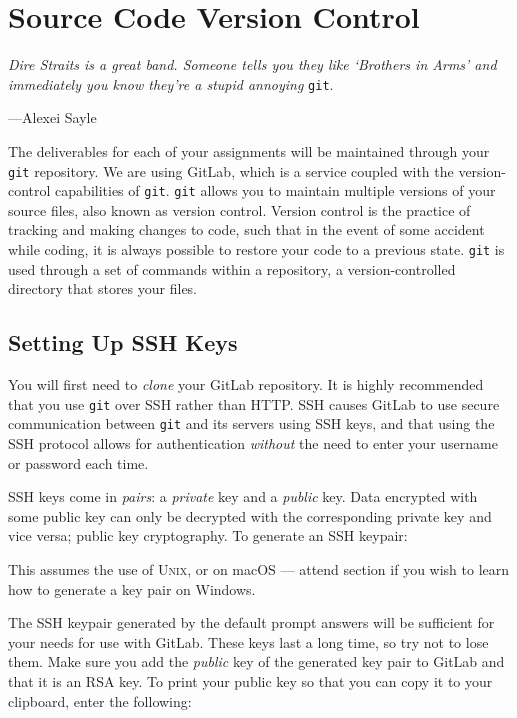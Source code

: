 \section{Source Code Version Control}

\epigraph{\emph{Dire Straits is a great band. Someone tells you they like
`Brothers in Arms' and immediately you know they're a stupid annoying}
\texttt{git}.}{---Alexei Sayle}

\noindent The deliverables for each of your assignments will be
maintained through your \texttt{git} repository. We are using GitLab,
which is a service coupled with the version-control capabilities of
\texttt{git}. \texttt{git} allows you to maintain multiple versions of
your source files, also known as version control. Version control is the
practice of tracking and making changes to code, such that in the event
of some accident while coding, it is always possible to restore your
code to a previous state. \texttt{git} is used through a set of commands
within a repository, a version-controlled directory that stores your
files.

\subsection{Setting Up SSH Keys}

You will first need to \emph{clone} your GitLab repository. It is highly
recommended that you use \texttt{git} over SSH rather than HTTP\@. SSH
causes GitLab to use secure communication between \texttt{git} and its
servers using SSH keys, and that using the SSH protocol allows for
authentication \emph{without} the need to enter your username or
password each time.

SSH keys come in \emph{pairs}: a \emph{private} key and a \emph{public}
key. Data encrypted with some public key can only be decrypted with the
corresponding private key and vice versa; public key cryptography. To
generate an SSH keypair:


This assumes the use of \textsc{Unix}, or on macOS --- attend section if
you wish to learn how to generate a key pair on Windows.

The SSH keypair generated by the default prompt answers will be
sufficient for your needs for use with GitLab. These keys last a long
time, so try not to lose them. Make sure you add the \emph{public} key
of the generated key pair to GitLab and that it is an RSA key. To print
your public key so that you can copy it to your clipboard, enter the
following:

